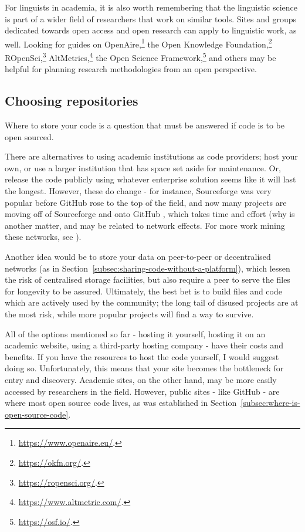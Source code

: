 For linguists in academia, it is also worth remembering that the linguistic science is part of a wider field of researchers that work on similar tools. Sites and groups dedicated towards open access and open research can apply to linguistic work, as well. Looking for guides on OpenAire,\footnote{\href{https://www.openaire.eu/}{https://www.openaire.eu/}. } the Open Knowledge Foundation,\footnote{\href{https://okfn.org/}{https://okfn.org/}. } ROpenSci,\footnote{\href{https://ropensci.org/}{https://ropensci.org/}. } AltMetrics,\footnote{\href{https://www.altmetric.com/}{https://www.altmetric.com/}. } the Open Science Framework,\footnote{\href{https://osf.io/}{https://osf.io/}. } and others may be helpful for planning research methodologies from an open perspective.

\subsection{Choosing repositories}
\label{choosing-repositories}

Where to store your code is a question that must be answered if code is to be open sourced.

There are alternatives to using academic institutions as code providers; host your own, or use a larger institution that has space set aside for maintenance. Or, release the code publicly using whatever enterprise solution seems like it will last the longest. However, these do change - for instance, Sourceforge was very popular before GitHub rose to the top of the field, and now many projects are moving off of Sourceforge and onto GitHub \citep{finley2011github}, which takes time and effort (why is another matter, and may be related to network effects. For more work mining these networks, see \citet{thung2013network, kalliamvakou2014promises}).

Another idea would be to store your data on peer-to-peer or decentralised networks (as in Section~\ref{subsec:sharing-code-without-a-platform}), which lessen the risk of centralised storage facilities, but also require a peer to serve the files for longevity to be assured. Ultimately, the best bet is to build files and code which are actively used by the community; the long tail of disused projects are at the most risk, while more popular projects will find a way to survive.

All of the options mentioned so far - hosting it yourself, hosting it on an academic website, using a third-party hosting company - have their costs and benefits. If you have the resources to host the code yourself, I would suggest doing so. Unfortunately, this means that your site becomes the bottleneck for entry and discovery. Academic sites, on the other hand, may be more easily accessed by researchers in the field. However, public sites - like GitHub - are where most open source code lives, as was established in Section~\ref{subsec:where-is-open-source-code}.

